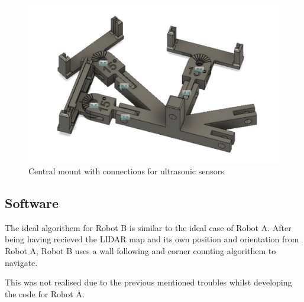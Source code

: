 \documentclass[11pt]{article}
\begin{document}
	\begin{figure}[h!]
		\centering
		\includegraphics[scale=0.5]{central_mount_conns}
		\caption{Central mount with connections for ultrasonic sensors}
	\end{figure}

	\pagebreak
	
	\subsection{Software}
	The ideal algorithem for Robot B is similar to the ideal case of Robot A. After being having recieved the LIDAR map and its own position and orientation from Robot A, Robot B uses a wall following and corner counting algorithem to navigate. \newline
	
	This was not realised due to the previous mentioned troubles whilst developing the code for Robot A.
	
\end{document}
